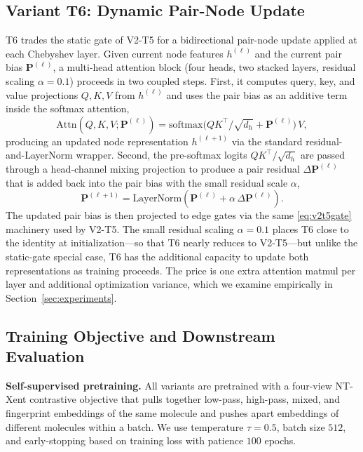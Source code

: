 \documentclass[conference]{IEEEtran}
\begin{document}
\subsection{Variant T6: Dynamic Pair-Node Update}
\label{sec:t6}
T6 trades the static gate of V2-T5 for a bidirectional pair-node update applied at each Chebyshev layer. Given current node features $h^{(\ell)}$ and the current pair bias $\mathbf{P}^{(\ell)}$, a multi-head attention block (four heads, two stacked layers, residual scaling $\alpha{=}0.1$) proceeds in two coupled steps. First, it computes query, key, and value projections $Q,K,V$ from $h^{(\ell)}$ and uses the pair bias as an additive term inside the softmax attention,
\begin{equation*}
    \mathrm{Attn}(Q,K,V;\mathbf{P}^{(\ell)}) = \mathrm{softmax}\!\bigl(QK^\top/\sqrt{d_h} + \mathbf{P}^{(\ell)}\bigr)\,V,
\end{equation*}
producing an updated node representation $h^{(\ell+1)}$ via the standard residual-and-LayerNorm wrapper. Second, the pre-softmax logits $QK^\top/\sqrt{d_h}$ are passed through a head-channel mixing projection to produce a pair residual $\Delta\mathbf{P}^{(\ell)}$ that is added back into the pair bias with the small residual scale $\alpha$,
\begin{equation*}
    \mathbf{P}^{(\ell+1)} = \mathrm{LayerNorm}\!\left(\mathbf{P}^{(\ell)} + \alpha\,\Delta\mathbf{P}^{(\ell)}\right).
\end{equation*}
The updated pair bias is then projected to edge gates via the same \eqref{eq:v2t5gate} machinery used by V2-T5. The small residual scaling $\alpha{=}0.1$ places T6 close to the identity at initialization---so that T6 nearly reduces to V2-T5---but unlike the static-gate special case, T6 has the additional capacity to update both representations as training proceeds. The price is one extra attention matmul per layer and additional optimization variance, which we examine empirically in Section~\ref{sec:experiments}.

\subsection{Training Objective and Downstream Evaluation}
\label{sec:training}
\noindent\textbf{Self-supervised pretraining.} All variants are pretrained with a four-view NT-Xent contrastive objective that pulls together low-pass, high-pass, mixed, and fingerprint embeddings of the same molecule and pushes apart embeddings of different molecules within a batch. We use temperature $\tau{=}0.5$, batch size $512$, and early-stopping based on training loss with patience $100$ epochs.
\end{document}
